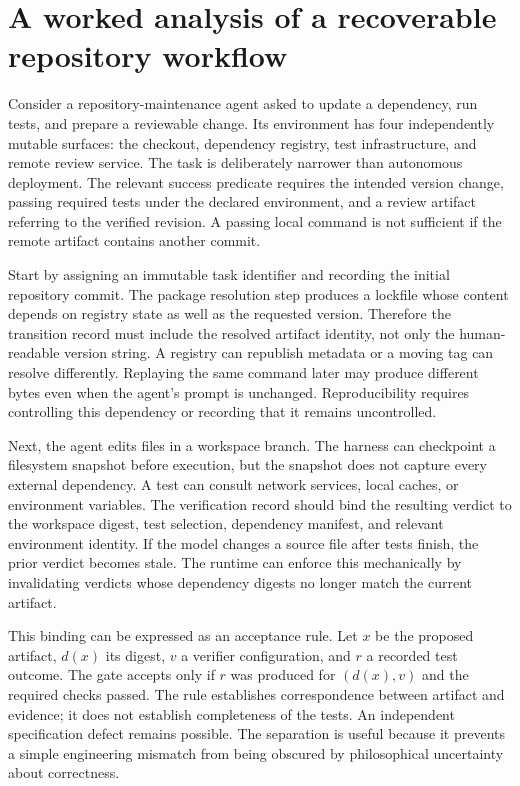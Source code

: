 \section{A worked analysis of a recoverable repository workflow}\label{sec:C20:case}
Consider a repository-maintenance agent asked to update a dependency, run tests, and prepare a reviewable change. Its environment has four independently mutable surfaces: the checkout, dependency registry, test infrastructure, and remote review service. The task is deliberately narrower than autonomous deployment. The relevant success predicate requires the intended version change, passing required tests under the declared environment, and a review artifact referring to the verified revision. A passing local command is not sufficient if the remote artifact contains another commit.

Start by assigning an immutable task identifier and recording the initial repository commit. The package resolution step produces a lockfile whose content depends on registry state as well as the requested version. Therefore the transition record must include the resolved artifact identity, not only the human-readable version string. A registry can republish metadata or a moving tag can resolve differently. Replaying the same command later may produce different bytes even when the agent's prompt is unchanged. Reproducibility requires controlling this dependency or recording that it remains uncontrolled.

Next, the agent edits files in a workspace branch. The harness can checkpoint a filesystem snapshot before execution, but the snapshot does not capture every external dependency. A test can consult network services, local caches, or environment variables. The verification record should bind the resulting verdict to the workspace digest, test selection, dependency manifest, and relevant environment identity. If the model changes a source file after tests finish, the prior verdict becomes stale. The runtime can enforce this mechanically by invalidating verdicts whose dependency digests no longer match the current artifact.

This binding can be expressed as an acceptance rule. Let $x$ be the proposed artifact, $d(x)$ its digest, $v$ a verifier configuration, and $r$ a recorded test outcome. The gate accepts only if $r$ was produced for $(d(x),v)$ and the required checks passed. The rule establishes correspondence between artifact and evidence; it does not establish completeness of the tests. An independent specification defect remains possible. The separation is useful because it prevents a simple engineering mismatch from being obscured by philosophical uncertainty about correctness.

